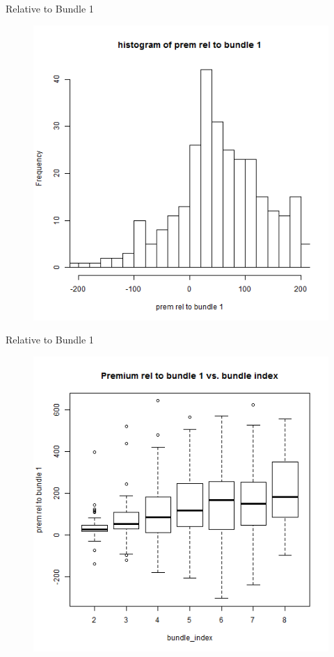 \documentclass[xcolor=dvipsnames,11pt]{beamer}
\theoremstyle{definition}
\begin{document}
\begin{frame}{Relative to Bundle 1}
\begin{figure}

\includegraphics[scale=0.43]{rel1_5_histogram_of_prem_rel_to_bundle_1_zoom_in_}
\end{figure}
\end{frame}

\begin{frame}{Relative to Bundle 1}
\begin{figure}

\includegraphics[scale=0.43]{rel1_6_boxplot_bundle_index_premrel1}
\end{figure}
\end{frame}
\end{document}
